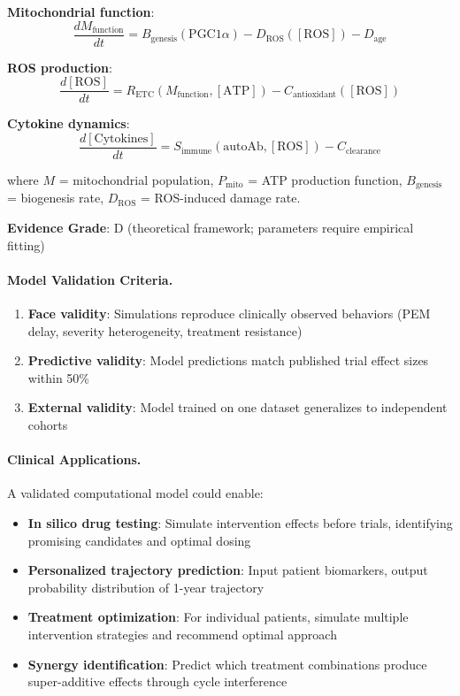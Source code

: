 \textbf{Mitochondrial function}:
\[
\frac{dM_{\text{function}}}{dt} = B_{\text{genesis}}(\text{PGC1}\alpha) - D_{\text{ROS}}([\text{ROS}]) - D_{\text{age}}
\]

\textbf{ROS production}:
\[
\frac{d[\text{ROS}]}{dt} = R_{\text{ETC}}(M_{\text{function}}, [\text{ATP}]) - C_{\text{antioxidant}}([\text{ROS}])
\]

\textbf{Cytokine dynamics}:
\[
\frac{d[\text{Cytokines}]}{dt} = S_{\text{immune}}(\text{autoAb}, [\text{ROS}]) - C_{\text{clearance}}
\]

where $M$ = mitochondrial population, $P_{\text{mito}}$ = ATP production function, $B_{\text{genesis}}$ = biogenesis rate, $D_{\text{ROS}}$ = ROS-induced damage rate.

\textbf{Evidence Grade}: D (theoretical framework; parameters require empirical fitting)

\paragraph{Model Validation Criteria.}

\begin{enumerate}
    \item \textbf{Face validity}: Simulations reproduce clinically observed behaviors (PEM delay, severity heterogeneity, treatment resistance)
    \item \textbf{Predictive validity}: Model predictions match published trial effect sizes within 50\%
    \item \textbf{External validity}: Model trained on one dataset generalizes to independent cohorts
\end{enumerate}

\paragraph{Clinical Applications.}

A validated computational model could enable:

\begin{itemize}
    \item \textbf{In silico drug testing}: Simulate intervention effects before trials, identifying promising candidates and optimal dosing
    \item \textbf{Personalized trajectory prediction}: Input patient biomarkers, output probability distribution of 1-year trajectory
    \item \textbf{Treatment optimization}: For individual patients, simulate multiple intervention strategies and recommend optimal approach
    \item \textbf{Synergy identification}: Predict which treatment combinations produce super-additive effects through cycle interference
\end{itemize}

